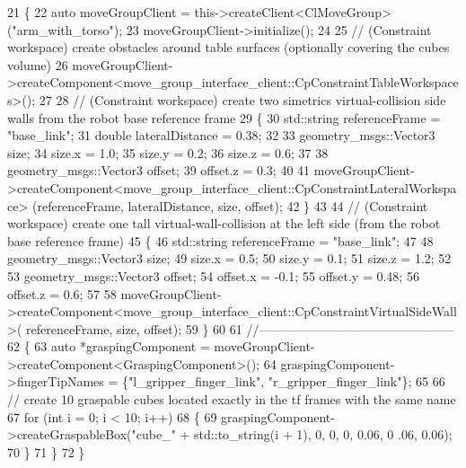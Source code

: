 \begin{DoxyCode}
21         \{
22             \textcolor{keyword}{auto} moveGroupClient = this->createClient<ClMoveGroup>(\textcolor{stringliteral}{"arm\_with\_torso"});
23             moveGroupClient->initialize();
24 
25             \textcolor{comment}{// (Constraint workspace) create obstacles around table surfaces (optionally covering the cubes
       volume)}
26             moveGroupClient->createComponent<move\_group\_interface\_client::CpConstraintTableWorkspaces>();
27 
28             \textcolor{comment}{// (Constraint workspace) create two simetrics virtual-collision side walls from the robot base
       reference frame}
29             \{
30                 std::string referenceFrame = \textcolor{stringliteral}{"base\_link"};
31                 \textcolor{keywordtype}{double} lateralDistance = 0.38;
32 
33                 geometry\_msgs::Vector3 size;
34                 size.x = 1.0;
35                 size.y = 0.2;
36                 size.z = 0.6;
37 
38                 geometry\_msgs::Vector3 offset;
39                 offset.z = 0.3;
40 
41                 moveGroupClient->createComponent<move\_group\_interface\_client::CpConstraintLateralWorkspace>
      (referenceFrame, lateralDistance, size, offset);
42             \}
43 
44             \textcolor{comment}{// (Constraint workspace) create one tall virtual-wall-collision at the left side (from the
       robot base reference frame)}
45             \{
46                 std::string referenceFrame = \textcolor{stringliteral}{"base\_link"};
47 
48                 geometry\_msgs::Vector3 size;
49                 size.x = 0.5;
50                 size.y = 0.1;
51                 size.z = 1.2;
52 
53                 geometry\_msgs::Vector3 offset;
54                 offset.x = -0.1;
55                 offset.y = 0.48;
56                 offset.z = 0.6;
57 
58                 moveGroupClient->createComponent<move\_group\_interface\_client::CpConstraintVirtualSideWall>(
      referenceFrame, size, offset);
59             \}
60 
61             \textcolor{comment}{//-----------------------------------------------}
62             \{
63                 \textcolor{keyword}{auto} *graspingComponent = moveGroupClient->createComponent<GraspingComponent>();
64                 graspingComponent->fingerTipNames = \{\textcolor{stringliteral}{"l\_gripper\_finger\_link"}, \textcolor{stringliteral}{"r\_gripper\_finger\_link"}\};
65 
66                 \textcolor{comment}{// create 10 graspable cubes located exactly in the tf frames with the same name }
67                 \textcolor{keywordflow}{for} (\textcolor{keywordtype}{int} i = 0; i < 10; i++)
68                 \{
69                     graspingComponent->createGraspableBox(\textcolor{stringliteral}{"cube\_"} + std::to\_string(i + 1), 0, 0, 0, 0.06, 0
      .06, 0.06);
70                 \}
71             \}
72         \}
\end{DoxyCode}



